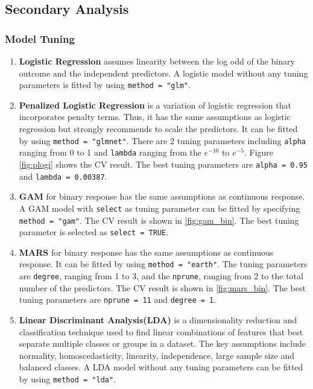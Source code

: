 \documentclass[11pt]{article}
\begin{document}
\subsection{Secondary Analysis}

\subsubsection{Model Tuning}
\begin{enumerate}

\item \textbf{Logistic Regression} assumes linearity between the log odd of the binary outcome and the independent predictors. A logistic model without any tuning parameters is fitted by using \texttt{method = "glm"}.

\item \textbf{Penalized Logistic Regression} is a variation of logistic regression that incorporates penalty terms. Thus, it has the same assumptions as logistic regression but strongly recommends to scale the predictors. It can be fitted by using \texttt{method = "glmnet"}. There are 2 tuning parameters including \texttt{alpha} ranging from 0 to 1 and \texttt{lambda} ranging from the $e^{-10}$ to $e^{-5}$. Figure \ref{fig:plogi} shows the CV result. The best tuning parameters are \texttt{alpha = 0.95} and \texttt{lambda = 0.00387}. 

\item \textbf{GAM} for binary response has the same assumptions as continuous response. A GAM model with \texttt{select} as tuning parameter can be fitted by specifying \texttt{method = "gam"}. The CV result is shown in \ref{fig:gam_bin}. The best tuning parameter is selected as \texttt{select = TRUE}.

\item \textbf{MARS} for binary response has the same assumptions as continuous response. It can be fitted by using \texttt{method = "earth"}. The tuning parameters are \texttt{degree}, ranging from 1 to 3, and the \texttt{nprune}, ranging from 2 to the total number of the predictors. The CV result is shown in \ref{fig:mars_bin}. The best tuning parameters are \texttt{nprune = 11} and \texttt{degree = 1}.

\item \textbf{Linear Discriminant Analysis(LDA)} is a dimensionality reduction and classification technique used to find linear combinations of features that best separate multiple classes or groups in a dataset. The key assumptions include normality, homoscedasticity, linearity, independence, large sample size and balanced classes. A LDA model without any tuning parameters can be fitted by using \texttt{method = "lda"}. 


\end{enumerate}
\end{document}
